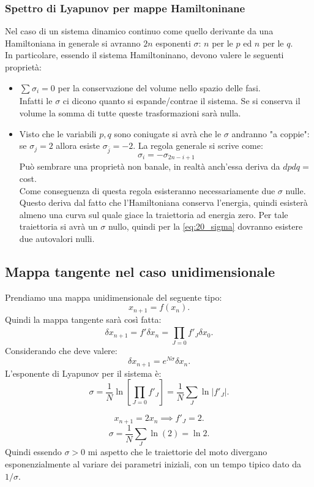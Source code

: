 \subsubsection{Spettro di Lyapunov per mappe Hamiltoninane}%
\label{subsub:Spettro di Lyapanov per mappe Hamiltoninane}
Nel caso di un sistema dinamico continuo come quello derivante da una Hamiltoniana in generale si avranno $2n$ esponenti $\sigma$: $n$ per le $p$ ed $n$ per le $q$.\\
In particolare, essendo il sistema Hamiltoninano, devono valere le seguenti proprietà:
\begin{itemize}
    \item $\sum_{}^{} \sigma_i = 0$ per la conservazione del volume nello spazio delle fasi.\\
	Infatti le $\sigma$ ci dicono quanto si espande/contrae il sistema. Se si conserva il volume la somma di tutte queste trasformazioni sarà nulla.
    \item Visto che le variabili $p, q$ sono coniugate si avrà che le $\sigma$ andranno "a coppie": se $\sigma_j=2$ allora esiste $\sigma_{\overline{j}}=-2$. La regola generale si scrive come:
	\begin{equation}
	    \sigma_i = - \sigma_{2n-i+1}
	    \label{eq:20_sigma}
	\end{equation}
	Può sembrare una proprietà non banale, in realtà anch'essa deriva da $dpdq = $ cost.\\
	Come conseguenza di questa regola esisteranno necessariamente due $\sigma$ nulle. \\
	Questo deriva dal fatto che l'Hamiltoniana conserva l'energia, quindi esisterà almeno una curva sul quale giace la traiettoria ad energia zero. Per tale traiettoria si avrà un $\sigma$ nullo, quindi per la \ref{eq:20_sigma} dovranno esistere due autovalori nulli.
\end{itemize}
\subsection{Mappa tangente nel caso unidimensionale}%
\label{sub:Mappa tangente nel caso unidimensionale}
Prendiamo una mappa unidimensionale del seguente tipo:
\[
    x_{n+1} = f(x_n)
.\] 
Quindi la mappa tangente sarà così fatta:
\[
    \delta x_{n+1} = f'\delta x_n = \prod_{J=0}^{} f'_J \delta x_0 
.\] 
Considerando che deve valere: 
\[
    \delta x_{n+1} = e^{N\sigma}\delta x_n
.\] 
L'esponente di Lyapunov per il sistema è:
\[
    \sigma  = \frac{1}{N} \ln\left[\prod_{J=0}^{} f'_J \right] =
    \frac{1}{N}\sum_{J}^{} \ln\left|f'_J\right|
.\]
\begin{exmp}
    \[
        x_{n+1}=2x_n
	\implies
        f'_J = 2
    .\] 
    \[
	\sigma  = \frac{1}{N}\sum_{J}^{} \ln (2) = \ln 2
    .\] 
    Quindi essendo $\sigma >0$ mi aspetto che le traiettorie del moto divergano esponenzialmente al variare dei parametri iniziali, con un tempo tipico dato da $1 /\sigma$.
\end{exmp}
